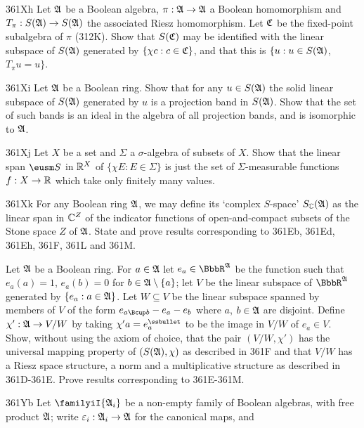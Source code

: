 {\spheader 361Xh Let $\frak A$ be a Boolean algebra,
$\pi:\frak A\to\frak A$ a Boolean homomorphism and
$T_{\pi}:S(\frak A)\to S(\frak A)$ the associated Riesz homomorphism.
Let $\frak C$ be the fixed-point subalgebra of $\pi$ (312K).
Show that $S(\frak C)$ may be identified with the linear subspace of
$S(\frak A)$ generated by $\{\chi c:c\in\frak C\}$, and that this is
$\{u:u\in S(\frak A)$, $T_{\pi}u=u\}$.

\spheader 361Xi Let $\frak A$ be a Boolean ring.   Show that for any
$u\in S(\frak A)$ the solid linear subspace of $S(\frak A)$ generated by
$u$ is a projection band in $S(\frak A)$.   Show that the set of such
bands is an ideal in the algebra of all projection bands, and is
isomorphic to $\frak A$.

\sqheader 361Xj Let $X$ be a set and $\Sigma$ a $\sigma$-algebra of subsets
of $X$.    Show that the linear span $\eusm S$ in $\Bbb R^X$ of
$\{\chi E:E\in\Sigma\}$ is just the set of $\Sigma$-measurable functions $f:X\to\Bbb R$ which take only finitely many values.

\spheader 361Xk For any Boolean ring $\frak A$, we may define its
`complex $S$-space' $S_{\Bbb C}(\frak A)$ as the linear span in
$\Bbb C^Z$ of the indicator functions of open-and-compact subsets of
the Stone space $Z$ of $\frak A$.   State and prove results corresponding
to 361Eb, 361Ed, 361Eh, 361F, 361L and 361M.

Let $\frak A$ be a Boolean ring.   For $a\in\frak A$ let
$e_a\in\BbbR^{\frak A}$ be the function such that $e_a(a)=1$, $e_a(b)=0$
for $b\in\frak A\setminus\{a\}$;  let $V$ be the linear subspace of
$\BbbR^{\frak A}$ generated by $\{e_a:a\in\frak A\}$.
Let $W\subseteq V$ be the linear subspace
spanned by members of $V$ of the form $e_{a\Bcup b}-e_a-e_b$ where $a$,
$b\in\frak A$ are disjoint.   Define $\chi':\frak A\to V/W$ by taking
$\chi'a=e_a^{\ssbullet}$ to be the image in $V/W$ of $e_a\in V$.
Show, without using
the axiom of choice, that the pair $(V/W,\chi')$ has the universal
mapping property of $(S(\frak A),\chi)$ as described in 361F and that
$V/W$ has a Riesz space structure, a norm and a multiplicative structure
as described in 361D-361E.  Prove results corresponding to 361E-361M.

\spheader 361Yb Let $\familyiI{\frak A_i}$ be a non-empty family
of Boolean algebras, with free product $\frak A$;  write
$\varepsilon_i:\frak A_i\to\frak A$ for the canonical maps, and

}
